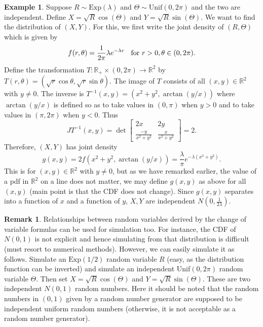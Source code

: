 \documentclass[preprint,  11pt]{amsart}
\def\l{\left}
\def\r{\right}
\theoremstyle{plain} %
\theoremstyle{definition} %
\newtheorem{remark}[theorem]{Remark}
\newtheorem{example}[theorem]{Example}
\newcommand{\matrices}[4]{\l[\begin{array}{cc} #1 & #2 \\ #3 & #4  \end{array} \r]}
\begin{document}
\begin{example} Suppose $R\sim \mbox{Exp}(\lambda)$ and $\Theta\sim \mbox{Unif}(0,2\pi)$ and the two are independent. Define $X=\sqrt{R}\cos(\Theta)$ and $Y=\sqrt{R}\sin(\Theta)$. We want to find the distribution of $(X,Y)$. For this, we first write the joint density of $(R,\Theta)$ which is given by 
$$
f(r,\theta)=\frac{1}{2\pi}\lambda e^{-\lambda r} \hspace{2mm}\mbox{ for }r>0,\theta\in (0,2\pi).
$$
Define the transformation $T:\mathbb{R}_{+}\times (0,2\pi)\rightarrow \mathbb{R}^{2}$ by $T(r,\theta)=(\sqrt{r}\cos\theta,\sqrt{r}\sin \theta)$. The image of $T$ consists of all $(x,y)\in \mathbb{R}^{2}$ with $y\not=0$. The inverse is $T^{-1}(x,y)=(x^{2}+y^{2},\arctan(y/x))$ where $\arctan(y/x)$ is defined so as to take values in $(0,\pi)$ when $y>0$ and to take values in $(\pi,2\pi)$ when $y<0$. Thus
$$
JT^{-1}(x,y) = \det\matrices{2x}{2y}{\frac{-y}{x^{2}+y^{2}}}{\frac{x}{x^{2}+y^{2}}}=2.
$$
Therefore, $(X,Y)$ has joint density 
$$
g(x,y) = 2f(x^{2}+y^{2},\arctan(y/x)) = \frac{\lambda}{\pi} e^{-\lambda(x^{2}+y^{2})}.
$$
This is for $(x,y)\in \mathbb{R}^{2}$ with $y\not=0$, but as we have remarked earlier, the value of a pdf in $\mathbb{R}^{2}$ on a line does not matter, we may define $g(x,y)$ as above for all $(x,y)$ (main point is that the CDF does not change). Since $g(x,y)$ separates into a function of $x$ and a function of $y$, $X,Y$ are independent $N(0,\frac{1}{2\lambda})$. 
\end{example}
\begin{remark} Relationships between random variables derived by the change of variable formulas can be used for simulation too. For instance, the CDF of $N(0,1)$ is not explicit and hence simulating from that distribution is difficult (must resort to numerical methods). However, we can easily simulate it as follows. Simulate an $\mbox{Exp}(1/2)$ random variable $R$ (easy, as the distribution function can be inverted) and simulate an independent $\mbox{Unif}(0,2\pi)$ random variable $\Theta$. Then set $X=\sqrt{R}\cos(\Theta)$ and $Y=\sqrt{R}\sin(\Theta)$. These are two independent $N(0,1)$ random numbers. Here it should be noted that the random numbers in $(0,1)$ given by a random number generator are supposed to be independent uniform random numbers (otherwise, it is not acceptable as a random number generator).
\end{remark}
\end{document}
